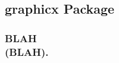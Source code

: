 \documentclass[class=book , crop=false]{standalone}
\title{}  %
\begin{document}


\subsection{graphicx Package}
\medskip
\subsubsection{\Large BLAH \\\small(BLAH).}
\end{document}
